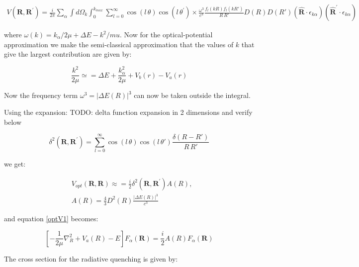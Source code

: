 \begin{equation}\label{optV1}
\begin{split}
V(\mathbf{R},\mathbf{R}^{'}) = \frac{i}{2\pi}\sum_{\alpha}\int{d\Omega_k}\int_0^{k_{max}}{\sum_{l=0}^{\infty}{\cos(l\, \theta)\cos(l\,\theta^{'})\times\frac{\omega^3}{c^3}\frac{f_l(kR)f_l(kR')}{R\,R'}D(R)D(R')(\hat{\mathbf{R}}\cdot\epsilon_{k\alpha})(\hat{\mathbf{R}}^{'}\cdot\epsilon_{k\alpha}) } }  
\end{split}
\end{equation}

where $ \omega(k) = k_{\alpha}/2\mu + \Delta E - k^2/mu $.  Now for the optical-potential approximation we make the semi-classical approximation that the values of $ k $ that give the largest contribution are given by:

\begin{equation}
\frac{k^2}{2\mu} \simeq = \Delta E + \frac{k_{\alpha}^2}{2\mu} + V_b(r) - V_a(r)
\end{equation}

Now the frequency term $ \omega^3 = \left|\Delta E(R)\right|^3 $ can now be taken outside the integral.

Using the expansion: TODO: delta function expansion in 2 dimensions and verify below

\begin{equation}
\delta^2\left(\mathbf{R},\mathbf{R}^{'}\right) = \sum_{l=0}^{\infty}{\cos(l\,\theta)\cos(l\,\theta')\frac{\delta(R - R')}{R\,R'}}
\end{equation}

we get:

\begin{equation}
\begin{split}
& V_{opt}(\mathbf{R},\mathbf{R}) \approx = \frac{i}{2}\delta^2\left(\mathbf{R},\mathbf{R}^{'}\right)A(R), \\[.8em]
& A(R) = \frac{4}{3}D^2(R)\frac{\left|\Delta E(R)\right|^3}{c^3}
\end{split}
\end{equation}

and equation \eqref{optV1} becomes:

\begin{equation}\label{optApprox}
\left[-\frac{1}{2\mu}\nabla_R^2 + V_a(R) - E\right]F_{\alpha}(\mathbf{R}) = \frac{i}{2}A(R)F_{\alpha}(\mathbf{R})
\end{equation}

The cross section for the radiative quenching is given by:

